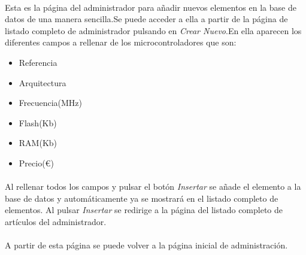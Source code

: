 \paragraph{} Esta es la página del administrador para añadir nuevos elementos en la base de datos de una manera sencilla.Se puede acceder a ella a partir de la página de listado completo de administrador pulsando en \textit{Crear Nuevo}.En ella aparecen los diferentes campos a rellenar de los microcontroladores que son:
\begin{itemize}
\item Referencia
\item Arquitectura
\item Frecuencia(MHz) 
\item Flash(Kb)
\item RAM(Kb) 
\item Precio($\euro$)
\end{itemize}

\paragraph{} Al rellenar todos los campos y pulsar el botón \textit{Insertar} se añade el elemento a la base de datos y automáticamente ya se mostrará en el listado completo de elementos. Al pulsar \textit{Insertar} se redirige a la página del listado completo de artículos del administrador.

\paragraph{} A partir de esta página se puede volver a la página inicial de administración.